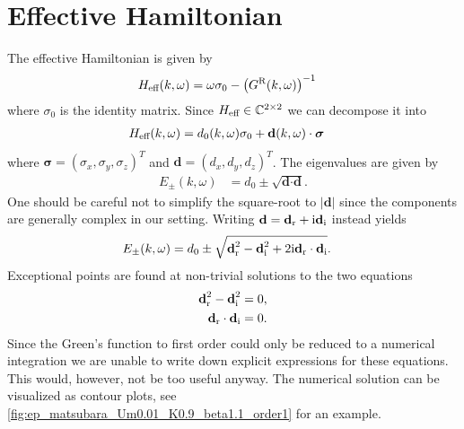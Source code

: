 \documentclass[english, parskip=full]{scrartcl}
\begin{document}
\section{Effective Hamiltonian}
The effective Hamiltonian is given by
\begin{align}
H_\Text{eff}(k,\omega) &= \omega\sigma_0 - \kla*{G^\R(k,\omega)}^{-1}
\end{align}
where $\sigma_0$ is the identity matrix.
Since $H_\Text{eff}\in\mathbb{C}^{2\times 2}$ we can decompose it into 
\begin{align}
H_\Text{eff}(k,\omega) &= d_0(k,\omega) \sigma_0 + \textbf{d}(k,\omega) \cdot \bm{\sigma}
\end{align}
where $\bm{\sigma} = (\sigma_x, \sigma_y, \sigma_z)^T$ and $\textbf{d} = (d_x,d_y,d_z)^T$.
The eigenvalues are given by
\begin{align}
E_\pm(k,\omega) &= d_0 \pm \sqrt{\textbf{d}\cdot \textbf{d}}.
\end{align}
One should be careful not to simplify the square-root to $|\textbf{d}|$ since the components are generally complex in our setting.
Writing $\textbf{d}=\textbf{d}_\r + \i \textbf{d}_\i$ instead yields
\begin{align}
E_\pm(k,\omega) &= d_0 \pm \sqrt{\textbf{d}_\r^2 - \textbf{d}_\i^2 + 2\i \textbf{d}_\r \cdot \textbf{d}_\i}.
\end{align}
Exceptional points are found at non-trivial solutions to the two equations
\begin{align}
\textbf{d}_\r^2 - \textbf{d}_\i^2 &= 0, \label{eqn:dr2 minus di2}\\
\textbf{d}_\r \cdot \textbf{d}_\i &= 0. \label{eqn:dr cdot di}
\end{align}
Since the Green's function to first order could only be reduced to a numerical integration we are unable to write down explicit expressions for these equations.
This would, however, not be too useful anyway.
The numerical solution can be visualized as contour plots, see \autoref{fig:ep_matsubara_Um0.01_K0.9_beta1.1_order1} for an example.
\end{document}

